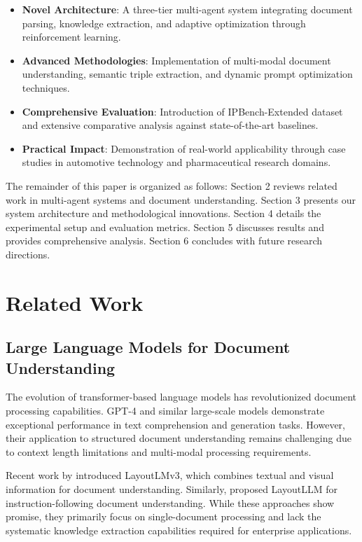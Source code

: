 \documentclass[11pt,a4paper]{article}
\begin{document}
\begin{itemize}
  \item \textbf{Novel Architecture}: A three-tier multi-agent system integrating document parsing, knowledge extraction, and adaptive optimization through reinforcement learning.
  
  \item \textbf{Advanced Methodologies}: Implementation of multi-modal document understanding, semantic triple extraction, and dynamic prompt optimization techniques.
  
  \item \textbf{Comprehensive Evaluation}: Introduction of IPBench-Extended dataset and extensive comparative analysis against state-of-the-art baselines.
  
  \item \textbf{Practical Impact}: Demonstration of real-world applicability through case studies in automotive technology and pharmaceutical research domains.
\end{itemize}

The remainder of this paper is organized as follows: Section 2 reviews related work in multi-agent systems and document understanding. Section 3 presents our system architecture and methodological innovations. Section 4 details the experimental setup and evaluation metrics. Section 5 discusses results and provides comprehensive analysis. Section 6 concludes with future research directions.

\section{Related Work}

\subsection{Large Language Models for Document Understanding}

The evolution of transformer-based language models has revolutionized document processing capabilities. GPT-4 \citep{openai2023gpt4} and similar large-scale models demonstrate exceptional performance in text comprehension and generation tasks. However, their application to structured document understanding remains challenging due to context length limitations and multi-modal processing requirements.

Recent work by \citet{li2024layoutlmv3} introduced LayoutLMv3, which combines textual and visual information for document understanding. Similarly, \citet{huang2024layoutllm} proposed LayoutLLM for instruction-following document understanding. While these approaches show promise, they primarily focus on single-document processing and lack the systematic knowledge extraction capabilities required for enterprise applications.
\end{document}
